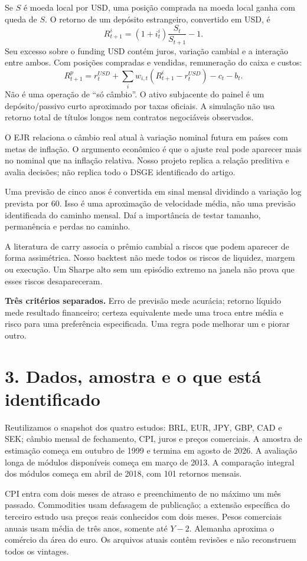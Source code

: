 \documentclass[11pt,a4paper]{article}
\begin{document}
Se $S$ é moeda local por USD, uma posição comprada na moeda local ganha com queda de $S$. O retorno de um depósito estrangeiro, convertido em USD, é
\[
R^i_{t+1}=(1+i^i_t)\frac{S_t}{S_{t+1}}-1.
\]
Seu excesso sobre o funding USD contém juros, variação cambial e a interação entre ambos. Com posições compradas e vendidas, remuneração do caixa e custos:
\[
R^p_{t+1}=r^{USD}_t+\sum_i w_{i,t}(R^i_{t+1}-r^{USD}_t)-c_t-b_t.
\]
Não é uma operação de ``só câmbio''. O ativo subjacente do painel é um depósito/passivo curto aproximado por taxas oficiais. A simulação não usa retorno total de títulos longos nem contratos negociáveis observados.

O EJR relaciona o câmbio real atual à variação nominal futura em países com metas de inflação. O argumento econômico é que o ajuste real pode aparecer mais no nominal que na inflação relativa. Nosso projeto replica a relação preditiva e avalia decisões; não replica todo o DSGE identificado do artigo.

Uma previsão de cinco anos é convertida em sinal mensal dividindo a variação log prevista por 60. Isso é uma aproximação de velocidade média, não uma previsão identificada do caminho mensal. Daí a importância de testar tamanho, permanência e perdas no caminho.

A literatura de carry associa o prêmio cambial a riscos que podem aparecer de forma assimétrica. Nosso backtest não mede todos os riscos de liquidez, margem ou execução. Um Sharpe alto sem um episódio extremo na janela não prova que esses riscos desapareceram.

\textbf{Três critérios separados.} Erro de previsão mede acurácia; retorno líquido mede resultado financeiro; certeza equivalente mede uma troca entre média e risco para uma preferência especificada. Uma regra pode melhorar um e piorar outro.

\clearpage
\section*{3. Dados, amostra e o que está identificado}

Reutilizamos o snapshot dos quatro estudos: BRL, EUR, JPY, GBP, CAD e SEK; câmbio mensal de fechamento, CPI, juros e preços comerciais. A amostra de estimação começa em outubro de 1999 e termina em agosto de 2026. A avaliação longa de módulos disponíveis começa em março de 2013. A comparação integral dos módulos começa em abril de 2018, com 101 retornos mensais.

CPI entra com dois meses de atraso e preenchimento de no máximo um mês passado. Commodities usam defasagem de publicação; a extensão específica do terceiro estudo usa preços reais conhecidos com dois meses. Pesos comerciais anuais usam média de três anos, somente até $Y-2$. Alemanha aproxima o comércio da área do euro. Os arquivos atuais contêm revisões e não reconstruem todos os vintages.
\end{document}
